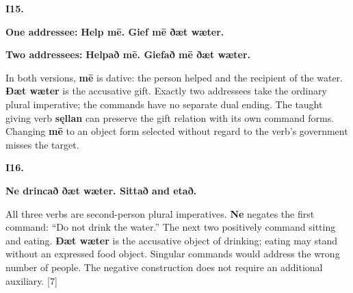 \par\begin{minipage}{\linewidth}\raggedright
\textbf{I15.}

\textbf{One addressee:} \textbf{Help mē. Gief mē ðæt wæter.}

\textbf{Two addressees:} \textbf{Helpað mē. Giefað mē ðæt wæter.}

In both versions, \textbf{mē} is dative: the person helped and the recipient of the water. \textbf{Ðæt wæter} is the accusative gift. Exactly two addressees take the ordinary plural imperative; the commands have no separate dual ending. The taught giving verb \textbf{sęllan} can preserve the gift relation with its own command forms. Changing \textbf{mē} to an object form selected without regard to the verb’s government misses the target.

\end{minipage}\par\addvspace{4pt}

\par\begin{minipage}{\linewidth}\raggedright
\textbf{I16.}

\textbf{Ne drincað ðæt wæter. Sittað and etað.}

All three verbs are second-person plural imperatives. \textbf{Ne} negates the first command: “Do not drink the water.” The next two positively command sitting and eating. \textbf{Ðæt wæter} is the accusative object of drinking; eating may stand without an expressed food object. Singular commands would address the wrong number of people. The negative construction does not require an additional auxiliary. [7]

\end{minipage}\par\addvspace{4pt}

